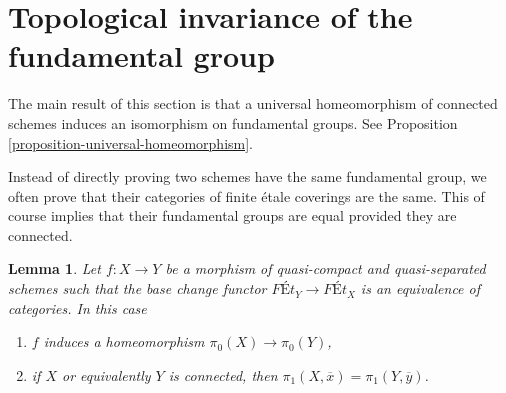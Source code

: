 \documentclass{stacks-project}
\theoremstyle{plain}
\newtheorem{lemma}[subsection]{Lemma}
\theoremstyle{definition}
\theoremstyle{remark}
\numberwithin{equation}{subsection}
\begin{document}
\section{Topological invariance of the fundamental group}
\label{section-topological-invariance}

\noindent
The main result of this section is that a universal homeomorphism
of connected schemes induces an isomorphism on fundamental groups.
See Proposition \ref{proposition-universal-homeomorphism}.

\medskip\noindent
Instead of directly proving two schemes have the same fundamental
group, we often prove that their categories of finite \'etale
coverings are the same. This of course implies that
their fundamental groups are equal provided they are connected.

\begin{lemma}
\label{lemma-what-equivalence-gives}
Let $f : X \to Y$ be a morphism of quasi-compact and quasi-separated schemes
such that the base change functor $\textit{F\'Et}_Y \to \textit{F\'Et}_X$
is an equivalence of categories. In this case
\begin{enumerate}
\item $f$ induces a homeomorphism $\pi_0(X) \to \pi_0(Y)$,
\item if $X$ or equivalently $Y$ is connected, then
$\pi_1(X, \overline{x}) = \pi_1(Y, \overline{y})$.
\end{enumerate}
\end{lemma}
\end{document}
